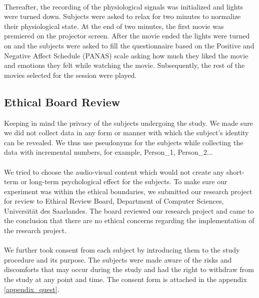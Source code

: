 \paragraph{}
Thereafter, the recording of the physiological signals was initialized and lights were turned down. Subjects were asked to relax for two minutes to normalize their physiological state. At the end of two minutes, the first movie was premiered on the projector screen. After the movie ended the lights were turned on and the subjects were asked to fill the questionnaire based on the Positive and Negative Affect Schedule (PANAS) scale \cite{panas_crocker:1997} asking how much they liked the movie and emotions they felt while watching the movie. Subsequently, the rest of the movies selected for the session were played.

\subsection{Ethical Board Review}
Keeping in mind the privacy of the subjects undergoing the study. We made sure we did not collect data in any form or manner with which the subject’s identity can be revealed. We thus use pseudonyms for the subjects while collecting the data with incremental numbers, for example, Person\_1, Person\_2...
\paragraph{}
We tried to choose the audio-visual content which would not create any short-term or long-term psychological effect for the subjects. To make sure our experiment was within the ethical boundaries, we submitted our research project for review to Ethical Review Board, Department of Computer Sciences, Universit{\"a}t des Saarlandes. The board reviewed our research project and came to the conclusion that there are no ethical concerns regarding the implementation of the research project.
\paragraph{}
We further took consent from each subject by introducing them to the study procedure and its purpose. The subjects were made aware of the risks and discomforts that may occur during the study and had the right to withdraw from the study at any point and time. The consent form is attached in the appendix \ref{appendix_quest}.